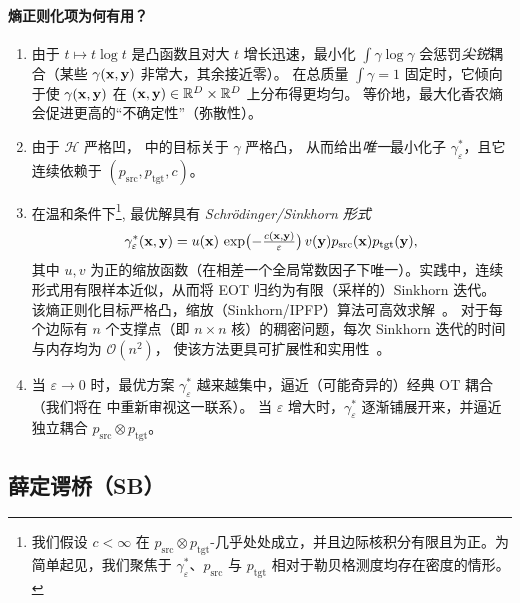 \paragraph{熵正则化项为何有用？}
\begin{enumerate}
  \item {}
  由于 $t\mapsto t\log t$ 是凸函数且对大 $t$ 增长迅速，最小化 $\int \gamma\log\gamma$
  会惩罚\emph{尖锐}耦合（某些 $\gamma({\mathbf{x}},{\mathbf{y}})$ 非常大，其余接近零）。
  在总质量 $\int \gamma=1$ 固定时，它倾向于使 $\gamma({\mathbf{x}},{\mathbf{y}})$ 在 $({\mathbf{x}},{\mathbf{y}})\in\mathbb{R}^D\times\mathbb{R}^D$ 上分布得更均匀。
  等价地，最大化香农熵会促进更高的“不确定性”（弥散性）。

  \item {}
  由于 $\mathcal{H}$ 严格凹， 中的目标关于 $\gamma$ 严格凸，
  从而给出\emph{唯一}最小化子 $\gamma^*_\varepsilon$，且它连续依赖于 $(p_{\mathrm{src}},p_{\mathrm{tgt}},c)$。

  \item {}
  在温和条件下\footnote{我们假设 $c<\infty$ 在 $p_{\mathrm{src}}\otimes p_{\mathrm{tgt}}$-几乎处处成立，并且边际核积分有限且为正。为简单起见，我们聚焦于 $\gamma^*_\varepsilon$、$p_{\mathrm{src}}$ 与 $p_{\mathrm{tgt}}$ 相对于勒贝格测度均存在密度的情形。
},
  最优解具有 \emph{Schrödinger/Sinkhorn 形式}
  \[
  \gamma^*_\varepsilon({\mathbf{x}},{\mathbf{y}}) = u({\mathbf{x}})\, \exp \bigl(-\tfrac{c({\mathbf{x}},{\mathbf{y}})}{\varepsilon}\bigr)  \,v({\mathbf{y}})p_{\mathrm{src}}({\mathbf{x}}) p_{\mathrm{tgt}}({\mathbf{y}}),
  \]
  其中 $u,v$ 为正的缩放函数（在相差一个全局常数因子下唯一）。实践中，连续形式用有限样本近似，从而将 EOT 归约为有限（采样的）Sinkhorn 迭代。
该熵正则化目标严格凸，缩放（Sinkhorn/IPFP）算法可高效求解~\citep{sinkhorn1964relationship,cuturi2013sinkhorn}。
对于每个边际有 $n$ 个支撑点（即 $n\times n$ 核）的稠密问题，每次 Sinkhorn 迭代的时间与内存均为 $\mathcal{O}(n^2)$，
使该方法更具可扩展性和实用性~\citep{altschuler2017near}。

  \item {}
当 $\varepsilon \to 0$ 时，最优方案 $\gamma^*_\varepsilon$ 越来越集中，逼近（可能奇异的）经典 OT 耦合（我们将在  中重新审视这一联系）。
当 $\varepsilon$ 增大时，$\gamma^*_\varepsilon$ 逐渐铺展开来，并逼近独立耦合 $p_{\mathrm{src}}\otimes p_{\mathrm{tgt}}$。
\end{enumerate}



\subsection{薛定谔桥（SB）}\label{subsec:sb}


